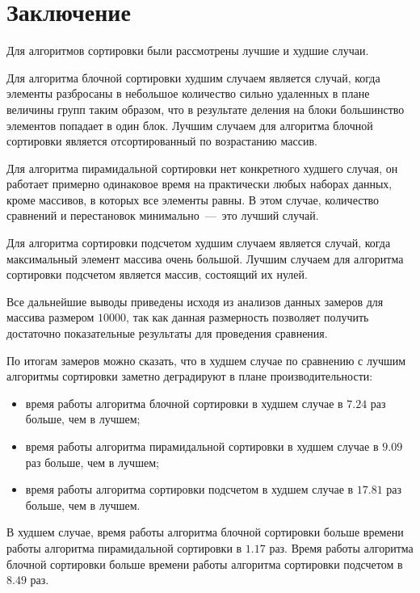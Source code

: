 \chapter*{Заключение}

Для алгоритмов сортировки были рассмотрены лучшие и худшие случаи.

Для алгоритма блочной сортировки худшим случаем является случай, когда элементы разбросаны в небольшое количество сильно удаленных в плане величины групп таким образом, что в результате деления на блоки большинство элементов попадает в один блок. Лучшим случаем для алгоритма блочной сортировки является отсортированный по возрастанию массив.

Для алгоритма пирамидальной сортировки нет конкретного худшего случая, он работает примерно одинаковое время на практически любых наборах данных, кроме массивов, в которых все элементы равны. В этом случае, количество сравнений и перестановок минимально~---~это лучший случай. 

Для алгоритма сортировки подсчетом худшим случаем является случай, когда максимальный элемент массива очень большой. Лучшим случаем для алгоритма сортировки подсчетом является массив, состоящий их нулей.

Все дальнейшие выводы приведены исходя из анализов данных замеров для массива размером $10 000$, так как данная размерность позволяет получить достаточно показательные результаты для проведения сравнения.

По итогам замеров можно сказать, что в худшем случае по сравнению с лучшим алгоритмы сортировки заметно деградируют в плане производительности:

\begin{itemize}
	\item время работы алгоритма блочной сортировки в худшем случае в $7.24$ раз больше, чем в лучшем;
	\item время работы алгоритма пирамидальной сортировки в худшем случае в $9.09$ раз больше, чем в лучшем;
	\item время работы алгоритма сортировки подсчетом в худшем случае в $17.81$ раз больше, чем в лучшем.
\end{itemize}

В худшем случае, время работы алгоритма блочной сортировки больше времени работы алгоритма пирамидальной сортировки в $1.17$ раз. Время работы алгоритма блочной сортировки больше времени работы алгоритма сортировки подсчетом в $8.49$ раз. 

